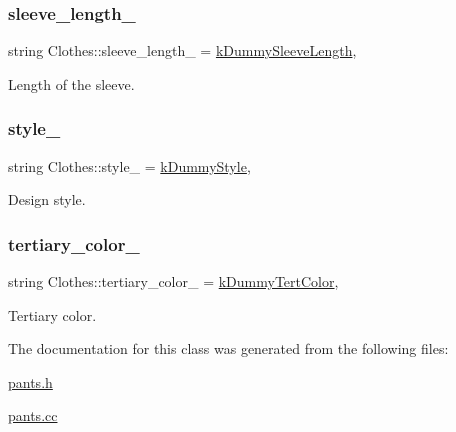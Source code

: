\subsubsection{\texorpdfstring{sleeve\+\_\+length\+\_\+}{sleeve\_length\_}}
{\footnotesize\ttfamily string Clothes\+::sleeve\+\_\+length\+\_\+ = \mbox{\hyperlink{clothes_8h_a0f53dde6a2c4c344bb7da50655497350}{k\+Dummy\+Sleeve\+Length}}\hspace{0.3cm}{\ttfamily [protected]}, {\ttfamily [inherited]}}



Length of the sleeve. 

\mbox{\label{classClothes_aa85ed2b95110d8c477a1aca9cb403f98}} 
\subsubsection{\texorpdfstring{style\+\_\+}{style\_}}
{\footnotesize\ttfamily string Clothes\+::style\+\_\+ = \mbox{\hyperlink{clothes_8h_a9deec6ed1f40928bfa0040eeab95ed6b}{k\+Dummy\+Style}}\hspace{0.3cm}{\ttfamily [protected]}, {\ttfamily [inherited]}}



Design style. 

\mbox{\label{classClothes_a3c5f1e7ab531e3ba7a38b930da8078a0}} 
\subsubsection{\texorpdfstring{tertiary\+\_\+color\+\_\+}{tertiary\_color\_}}
{\footnotesize\ttfamily string Clothes\+::tertiary\+\_\+color\+\_\+ = \mbox{\hyperlink{clothes_8h_a094dde85547895fd70dafb3ab10c6783}{k\+Dummy\+Tert\+Color}}\hspace{0.3cm}{\ttfamily [protected]}, {\ttfamily [inherited]}}



Tertiary color. 



The documentation for this class was generated from the following files\+:\begin{DoxyCompactItemize}
\item 
\mbox{\hyperlink{pants_8h}{pants.\+h}}\item 
\mbox{\hyperlink{pants_8cc}{pants.\+cc}}\end{DoxyCompactItemize}
